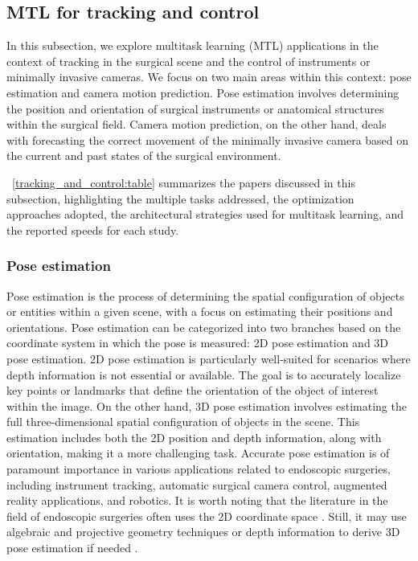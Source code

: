 \documentclass[times,twocolumn,final]{elsarticle}
\newcommand{\tabref}[1]{\tablename~\ref{#1}}
\begin{document}
\subsection{MTL for tracking and control} \label{sec::mtl_surgical::pose_automatic_camera}

In this subsection, we explore multitask learning (MTL) applications in the context of tracking in the surgical scene and the control of instruments or minimally invasive cameras. We focus on two main areas within this context: pose estimation and camera motion prediction. Pose estimation involves determining the position and orientation of surgical instruments or anatomical structures within the surgical field. Camera motion prediction, on the other hand, deals with forecasting the correct movement of the minimally invasive camera based on the current and past states of the surgical environment.


\tabref{tracking_and_control:table} summarizes the papers discussed in this subsection, highlighting the multiple tasks addressed, the optimization approaches adopted, the architectural strategies used for multitask learning, and the reported speeds for each study.


\subsubsection{Pose estimation}
Pose estimation is the process of determining the spatial configuration of objects or entities within a given scene, with a focus on estimating their positions and orientations. Pose estimation can be categorized into two branches based on the coordinate system in which the pose is measured: 2D pose estimation and 3D pose estimation.
2D pose estimation is particularly well-suited for scenarios where depth information is not essential or available. The goal is to accurately localize key points or landmarks that define the orientation of the object of interest within the image.
On the other hand, 3D pose estimation involves estimating the full three-dimensional spatial configuration of objects in the scene. This estimation includes both the 2D position and depth information, along with orientation, making it a more challenging task.
Accurate pose estimation is of paramount importance in various applications related to endoscopic surgeries, including instrument tracking, automatic surgical camera control, augmented reality applications, and robotics. It is worth noting that the literature in the field of endoscopic surgeries often uses the 2D coordinate space \citep{multi_semi_pose,concurrent_segmentation_iro_laina,art_net,learning_look_tracking,Islam2020_ST_MTL,li2021data}. 
Still, it may use algebraic and projective geometry techniques or depth information to derive 3D pose estimation if needed \citep{art_net,li2021data}. 
\end{document}

